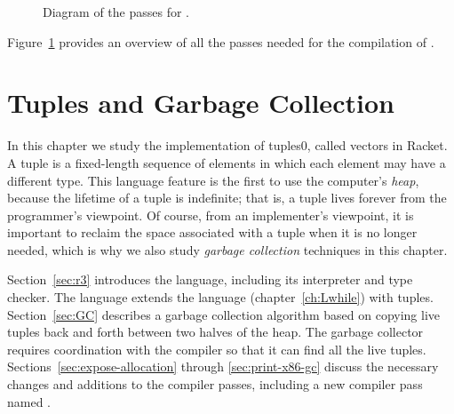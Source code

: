 \documentclass[7x10]{TimesAPriori_MIT}%
\def\racketEd{0}
\providecommand{\BookEdition}{1}
\let\edition\BookEdition
\newcommand{\racket}[1]{{\if\edition\racketEd{#1}\fi}}
\numberwithin{theorem}{chapter}
\numberwithin{definition}{chapter}
\numberwithin{equation}{chapter}
\begin{document}
\begin{figure}[tp]
\begin{tcolorbox}[colback=white]
{
\fi}
\end{tcolorbox}

\caption{Diagram of the passes for \LangLoop{}.}
\label{fig:Lwhile-passes}
\end{figure}

Figure~\ref{fig:Lwhile-passes} provides an overview of all the passes needed
for the compilation of \LangLoop{}.






\chapter{Tuples and Garbage Collection}
\label{ch:Lvec}
\setcounter{footnote}{0}

In this chapter we study the implementation of tuples\racket{, called
  vectors in Racket}.  A tuple is a fixed-length sequence of elements
in which each element may have a different type.
%
This language feature is the first to use the computer's
\emph{heap}, because the lifetime of a tuple is
indefinite; that is, a tuple lives forever from the programmer's
viewpoint. Of course, from an implementer's viewpoint, it is important
to reclaim the space associated with a tuple when it is no longer
needed, which is why we also study \emph{garbage collection}
 techniques in this chapter.

Section~\ref{sec:r3} introduces the \LangVec{} language, including its
interpreter and type checker. The \LangVec{} language extends the \LangLoop{}
language (chapter~\ref{ch:Lwhile}) with tuples.
%
Section~\ref{sec:GC} describes a garbage collection algorithm based on
copying live tuples back and forth between two halves of the heap. The
garbage collector requires coordination with the compiler so that it
can find all the live tuples.
%
Sections~\ref{sec:expose-allocation} through \ref{sec:print-x86-gc}
discuss the necessary changes and additions to the compiler passes,
including a new compiler pass named .
\end{document}
